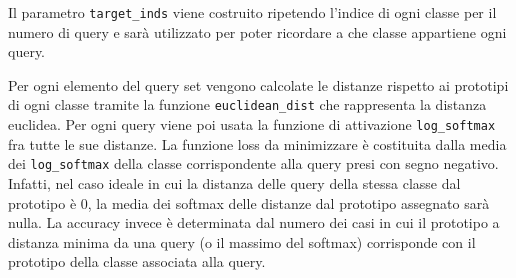 \documentclass[12pt,a4paper,titlepage]{article}
\begin{document}
Il parametro \texttt{target\_inds} viene costruito ripetendo l'indice di ogni classe per il numero di query e sarà utilizzato per poter ricordare a che classe appartiene ogni query.

Per ogni elemento del query set vengono calcolate le distanze rispetto ai prototipi di ogni classe tramite la funzione \texttt{euclidean\_dist} che rappresenta la distanza euclidea.
Per ogni query viene poi usata la funzione di attivazione \texttt{log\_softmax} fra tutte le sue distanze.
La funzione loss da minimizzare è costituita dalla media dei \texttt{log\_softmax} della classe corrispondente alla query presi con segno negativo. Infatti, nel caso ideale in cui la distanza delle query della stessa classe dal prototipo è 0, la media dei softmax delle distanze dal prototipo assegnato sarà nulla.
La accuracy invece è determinata dal numero dei casi in cui il prototipo a distanza minima da una query (o il massimo del softmax) corrisponde con il prototipo della classe associata alla query.
\end{document}
